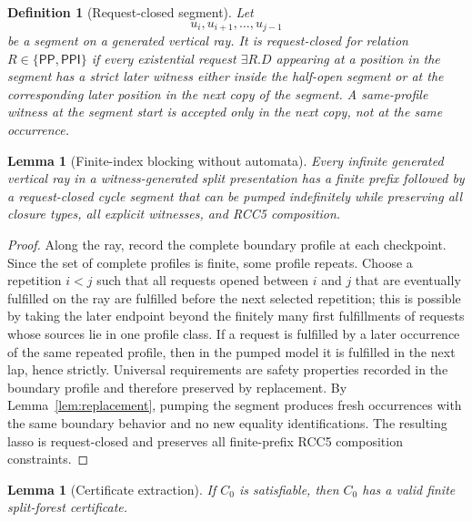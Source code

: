 \documentclass[11pt]{article}
\newtheorem{lemma}[theorem]{Lemma}
\newtheorem{definition}[theorem]{Definition}
\newcommand{\PP}{\mathsf{PP}}
\newcommand{\PPI}{\mathsf{PPI}}
\begin{document}
\begin{definition}[Request-closed segment]
Let
\[
  u_i,u_{i+1},\ldots,u_{j-1}
\]
be a segment on a generated vertical ray.  It is request-closed for relation \(R\in\{\PP,\PPI\}\) if every existential request \(\exists R.D\) appearing at a position in the segment has a strict later witness either inside the half-open segment or at the corresponding later position in the next copy of the segment.  A same-profile witness at the segment start is accepted only in the next copy, not at the same occurrence.
\end{definition}

\begin{lemma}[Finite-index blocking without automata]\label{lem:blocking}
Every infinite generated vertical ray in a witness-generated split presentation has a finite prefix followed by a request-closed cycle segment that can be pumped indefinitely while preserving all closure types, all explicit witnesses, and RCC5 composition.
\end{lemma}

\begin{proof}
Along the ray, record the complete boundary profile at each checkpoint.  Since the set of complete profiles is finite, some profile repeats.  Choose a repetition \(i<j\) such that all requests opened between \(i\) and \(j\) that are eventually fulfilled on the ray are fulfilled before the next selected repetition; this is possible by taking the later endpoint beyond the finitely many first fulfillments of requests whose sources lie in one profile class.  If a request is fulfilled by a later occurrence of the same repeated profile, then in the pumped model it is fulfilled in the next lap, hence strictly.  Universal requirements are safety properties recorded in the boundary profile and therefore preserved by replacement.  By Lemma~\ref{lem:replacement}, pumping the segment produces fresh occurrences with the same boundary behavior and no new equality identifications.  The resulting lasso is request-closed and preserves all finite-prefix RCC5 composition constraints.
\end{proof}

\begin{lemma}[Certificate extraction]\label{lem:extraction}
If \(C_0\) is satisfiable, then \(C_0\) has a valid finite split-forest certificate.
\end{lemma}
\end{document}
